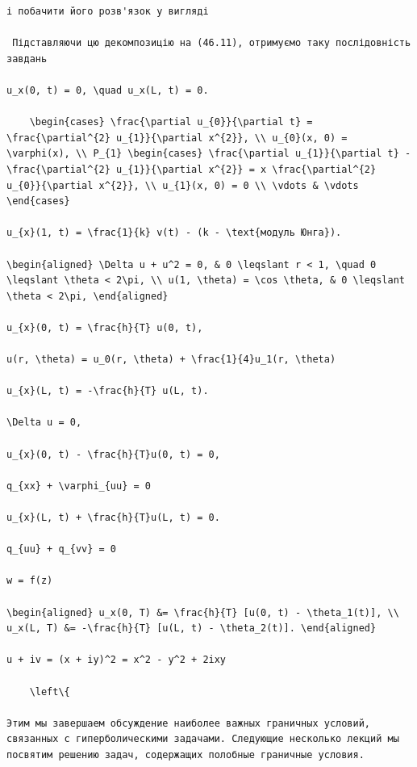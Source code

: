 \documentclass[
  ukrainian,
]{article}
\begin{document}
\begin{verbatim}
і побачити його розв'язок у вигляді

 Підставляючи цю декомпозицію на (46.11), отримуємо таку послідовність завдань

u_x(0, t) = 0, \quad u_x(L, t) = 0.

    \begin{cases} \frac{\partial u_{0}}{\partial t} = \frac{\partial^{2} u_{1}}{\partial x^{2}}, \\ u_{0}(x, 0) = \varphi(x), \\ P_{1} \begin{cases} \frac{\partial u_{1}}{\partial t} - \frac{\partial^{2} u_{1}}{\partial x^{2}} = x \frac{\partial^{2} u_{0}}{\partial x^{2}}, \\ u_{1}(x, 0) = 0 \\ \vdots & \vdots \end{cases}

u_{x}(1, t) = \frac{1}{k} v(t) - (k - \text{модуль Юнга}).

\begin{aligned} \Delta u + u^2 = 0, & 0 \leqslant r < 1, \quad 0 \leqslant \theta < 2\pi, \\ u(1, \theta) = \cos \theta, & 0 \leqslant \theta < 2\pi, \end{aligned}

u_{x}(0, t) = \frac{h}{T} u(0, t),

u(r, \theta) = u_0(r, \theta) + \frac{1}{4}u_1(r, \theta)

u_{x}(L, t) = -\frac{h}{T} u(L, t).

\Delta u = 0,

u_{x}(0, t) - \frac{h}{T}u(0, t) = 0,

q_{xx} + \varphi_{uu} = 0

u_{x}(L, t) + \frac{h}{T}u(L, t) = 0.

q_{uu} + q_{vv} = 0

w = f(z)

\begin{aligned} u_x(0, T) &= \frac{h}{T} [u(0, t) - \theta_1(t)], \\ u_x(L, T) &= -\frac{h}{T} [u(L, t) - \theta_2(t)]. \end{aligned}

u + iv = (x + iy)^2 = x^2 - y^2 + 2ixy

    \left\{

Этим мы завершаем обсуждение наиболее важных граничных условий, связанных с гиперболическими задачами. Следующие несколько лекций мы посвятим решению задач, содержащих полобные граничные условия.


\end{verbatim}
\end{document}
